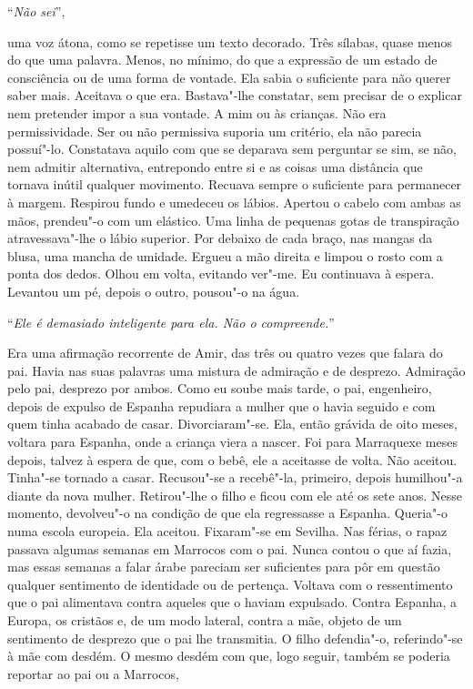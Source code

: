 ``\emph{Não sei}'',

uma voz átona, como se repetisse um texto decorado. Três sílabas, quase
menos do que uma palavra. Menos, no mínimo, do que a expressão de um
estado de consciência ou de uma forma de vontade. Ela sabia o suficiente
para não querer saber mais. Aceitava o que era. Bastava"-lhe constatar,
sem precisar de o explicar nem pretender impor a sua vontade. A mim ou
às crianças. Não era permissividade. Ser ou não permissiva suporia um
critério, ela não parecia possuí"-lo. Constatava aquilo com que se
deparava sem perguntar se sim, se não, nem admitir alternativa,
entrepondo entre si e as coisas uma distância que tornava inútil
qualquer movimento. Recuava sempre o suficiente para permanecer à
margem. Respirou fundo e umedeceu os lábios. Apertou o cabelo com ambas
as mãos, prendeu"-o com um elástico. Uma linha de pequenas gotas de
transpiração atravessava"-lhe o lábio superior. Por debaixo de cada
braço, nas mangas da blusa, uma mancha de umidade. Ergueu a mão direita
e limpou o rosto com a ponta dos dedos. Olhou em volta, evitando
ver"-me. Eu continuava à espera. Levantou um pé, depois o outro,
pousou"-o na água.

``\emph{Ele é demasiado inteligente para ela. Não o compreende.}''

Era uma afirmação recorrente de Amir, das três ou quatro vezes que
falara do pai. Havia nas suas palavras uma mistura de admiração e de
desprezo. Admiração pelo pai, desprezo por ambos. Como eu soube mais
tarde, o pai, engenheiro, depois de expulso de Espanha repudiara a
mulher que o havia seguido e com quem tinha acabado de casar.
Divorciaram"-se. Ela, então grávida de oito meses, voltara para Espanha,
onde a criança viera a nascer. Foi para Marraquexe meses depois, talvez
à espera de que, com o bebê, ele a aceitasse de volta. Não aceitou.
Tinha"-se tornado a casar. Recusou"-se a recebê"-la, primeiro, depois
humilhou"-a diante da nova mulher. Retirou"-lhe o filho e ficou com ele
até os sete anos. Nesse momento, devolveu"-o na condição de que ela
regressasse a Espanha. Queria"-o numa escola europeia. Ela aceitou.
Fixaram"-se em Sevilha. Nas férias, o rapaz passava algumas semanas em
Marrocos com o pai. Nunca contou o que aí fazia, mas essas semanas a
falar árabe pareciam ser suficientes para pôr em questão qualquer
sentimento de identidade ou de pertença. Voltava com o ressentimento que
o pai alimentava contra aqueles que o haviam expulsado. Contra Espanha,
a Europa, os cristãos e, de um modo lateral, contra a mãe, objeto de um
sentimento de desprezo que o pai lhe transmitia. O filho defendia"-o,
referindo"-se à mãe com desdém. O mesmo desdém com que, logo seguir,
também se poderia reportar ao pai ou a Marrocos,

